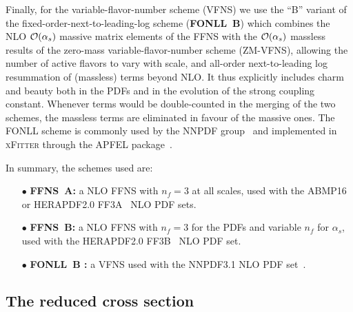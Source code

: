 \documentclass[pdftex,twocolumn,epjc3]{svjour3}          %
\newcommand{\abmp} {ABMP16\xspace}
\newcommand{\nnpdf} {NNPDF3.1\xspace}
\newcommand{\xfitter} {\textsc{xFitter}\xspace}
\newcommand{\ffns} {{FFNS~A}\xspace}
\newcommand{\ffnsb} {{FFNS~B}\xspace}
\newcommand{\ffthreea} {{\hbox{HERAPDF2.0} FF3A}\xspace}
\newcommand{\ffthreeb} {{\hbox{HERAPDF2.0} FF3B}\xspace}
\begin{document}
Finally, for the variable-flavor-number scheme (VFNS) we use the ``B''
variant of the fixed-order-next-to-leading-log scheme ({\bf FONLL~B})
which combines the NLO ${\cal O}(\alpha_s)$ massive matrix elements of
the FFNS with the ${\cal O}(\alpha_s)$ massless results of the
zero-mass variable-flavor-number scheme (ZM-VFNS), allowing the number
of active flavors to vary with scale, and all-order next-to-leading
log resummation of (massless) terms beyond NLO.  It thus explicitly
includes charm and beauty both in the PDFs and in the evolution of the
strong coupling constant.  Whenever terms would be double-counted in
the merging of the two schemes, the massless terms are eliminated in
favour of the massive ones. The FONLL scheme is commonly used by the
NNPDF group~\cite{Ball:2017nwa} and implemented in \xfitter through
the APFEL package~\cite{Bertone:2013vaa}.

In summary, the schemes used are:
\begin{itemize}
  \setlength\itemsep{1em}

\item[$\bullet$] {\bf \ffns :} a NLO FFNS with $n_f = 3$ at all
  scales, used with the \abmp~\cite{Alekhin:2018pai} or
  \ffthreea~\cite{Abramowicz:2015mha} NLO PDF sets.

\item[$\bullet$] {\bf \ffnsb :} a NLO FFNS with $n_f = 3$ for the PDFs
  and variable $n_f$ for $\alpha_s$, used with the
  \ffthreeb~\cite{Abramowicz:2015mha} NLO PDF set.

\item[$\bullet$] {\bf FONLL~B :} a VFNS used with the \nnpdf NLO PDF
  set~\cite{Ball:2017nwa}.
\end{itemize}


\subsection{The reduced cross section}\label{sec-redsigma}
\end{document}
